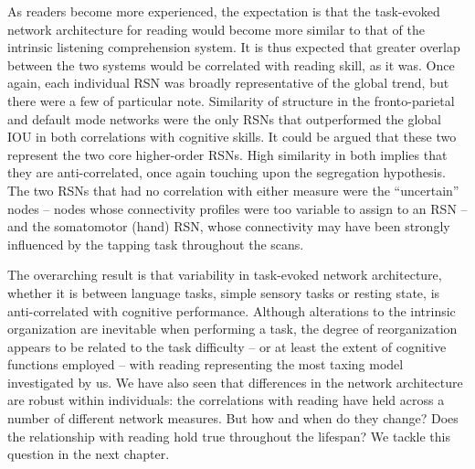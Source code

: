 As readers become more experienced, the expectation is that the task-evoked network architecture for reading would become more similar to that of the intrinsic listening comprehension system. It is thus expected that greater overlap between the two systems would be correlated with reading skill, as it was. Once again, each individual RSN was broadly representative of the global trend, but there were a few of particular note. Similarity of structure in the fronto-parietal and default mode networks were the only RSNs that outperformed the global IOU in both correlations with cognitive skills. It could be argued that these two represent the two core higher-order RSNs. High similarity in both implies that they are anti-correlated, once again touching upon the segregation hypothesis. The two RSNs that had no correlation with either measure were the ``uncertain'' nodes -- nodes whose connectivity profiles were too variable to assign to an RSN -- and the somatomotor (hand) RSN, whose connectivity may have been strongly influenced by the tapping task throughout the scans. 

%
The overarching result is that variability in task-evoked network architecture, whether it is between language tasks, simple sensory tasks or resting state, is anti-correlated with cognitive performance. Although alterations to the intrinsic organization are inevitable when performing a task, the degree of reorganization appears to be related to the task difficulty -- or at least the extent of cognitive functions employed -- with reading representing the most taxing model investigated by us. We have also seen that differences in the network architecture are robust within individuals: the correlations with reading have held across a number of different network measures. But how and when do they change? Does the relationship with reading hold true throughout the lifespan? We tackle this question in the next chapter. 